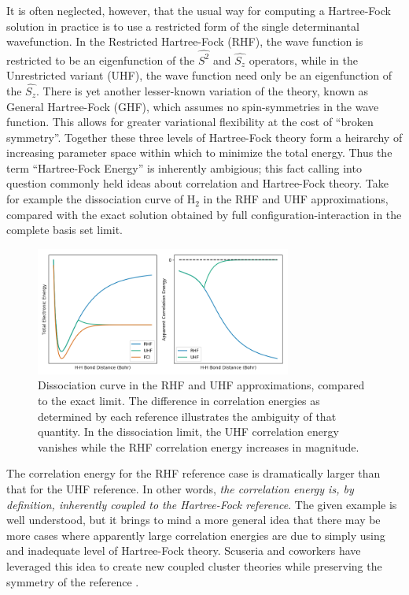 \documentclass{revtex4}
\begin{document}
      It is often neglected, however, that the usual way for computing a Hartree-Fock solution in 
      practice
    is to use a restricted form of the single determinantal wavefunction. In the Restricted 
    Hartree-Fock (RHF), the wave function is restricted to be an eigenfunction of the $\hat{S^2}$ 
    and $\hat{S_z}$ 
    operators, while in the Unrestricted variant (UHF), the wave function need only be an 
    eigenfunction 
    of the $\hat{S_z}$. There is yet another lesser-known variation of the theory, known as General 
    Hartree-Fock (GHF), which assumes no spin-symmetries in the wave function. This allows for 
    greater
    variational flexibility at the cost of ``broken symmetry''. Together these three levels of 
    Hartree-Fock theory form a heirarchy of increasing parameter space within which to minimize the 
    total energy. Thus the term ``Hartree-Fock Energy'' is inherently ambigious; this fact calling 
    into question commonly held ideas about correlation and Hartree-Fock theory. Take for example 
    the dissociation curve of H$_2$ in the RHF and UHF approximations, compared with the exact 
    solution obtained by full configuration-interaction in the complete basis set limit. 
    
    \begin{figure}[H]
      \centering
      \includegraphics[width=0.75\textwidth]{../figures/H2_curves.png}
      \caption{Dissociation curve in the RHF and UHF approximations, compared to the 
               exact limit. The difference in correlation energies as determined by 
               each reference illustrates the ambiguity of that quantity. In the             
               dissociation limit, the UHF correlation energy vanishes while the RHF
               correlation energy increases in magnitude.}
      \label{h2diss}
    \end{figure}
    
    The correlation energy for the RHF reference case is dramatically larger than that for the UHF 
    reference. In other words, \emph{the correlation energy is, by definition, inherently coupled 
    to the 
    Hartree-Fock reference}. The given example is well understood, but it brings to mind a more 
    general idea that there may be more cases where apparently large correlation energies are due 
    to simply 
    using and inadequate level of Hartree-Fock theory. Scuseria and coworkers have leveraged this 
    idea to create new coupled cluster theories while preserving the symmetry of the reference 
    \cite{Gomez2016}. 
    
\end{document}

